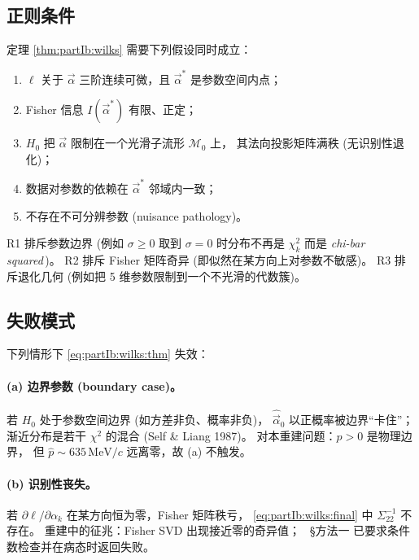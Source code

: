 \subsection{正则条件}
\label{sec:partIb:wilks:cond}

定理 \ref{thm:partIb:wilks} 需要下列假设同时成立：
\begin{enumerate}[label=(R\arabic*)]
  \item $\ell$ 关于 $\vec{\alpha}$ 三阶连续可微，且 $\vec{\alpha}^{*}$ 是参数空间内点；
  \item Fisher 信息 $I(\vec{\alpha}^{*})$ 有限、正定；
  \item $H_0$ 把 $\vec{\alpha}$ 限制在一个光滑子流形 $\mathcal M_0$ 上，
        其法向投影矩阵满秩 (无识别性退化)；
  \item 数据对参数的依赖在 $\vec{\alpha}^{*}$ 邻域内一致；
  \item 不存在不可分辨参数 (nuisance pathology)。
\end{enumerate}

R1 排斥参数边界 (例如 $\sigma\geq 0$ 取到 $\sigma=0$ 时分布不再是 $\chi^2_{k}$
而是\emph{ chi-bar squared}\,)。
R2 排斥 Fisher 矩阵奇异 (即似然在某方向上对参数不敏感)。
R3 排斥退化几何 (例如把 5 维参数限制到一个不光滑的代数簇)。

\subsection{失败模式}
\label{sec:partIb:wilks:fail}

下列情形下 \eqref{eq:partIb:wilks:thm} 失效：

\paragraph{(a) 边界参数 (boundary case)。}
若 $H_0$ 处于参数空间边界 (如方差非负、概率非负)，
$\hat{\vec{\alpha}}_0$ 以正概率被边界“卡住”；
渐近分布是若干 $\chi^2$ 的混合 (Self \& Liang 1987)。
对本重建问题：$p > 0$ 是物理边界，
但 $\hat p\sim 635\,\mathrm{MeV}/c$ 远离零，故 (a) 不触发。

\paragraph{(b) 识别性丧失。}
若 $\partial\ell/\partial\alpha_k$ 在某方向恒为零，Fisher 矩阵秩亏，
\eqref{eq:partIb:wilks:final} 中 $\Sigma_{22}^{-1}$ 不存在。
重建中的征兆：Fisher SVD 出现接近零的奇异值；
\StatusReport\ §方法一 已要求条件数检查并在病态时返回失败。

